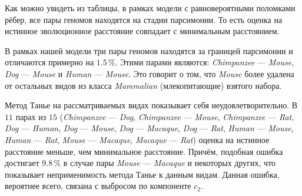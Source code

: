 Как можно увидеть из таблицы, в рамках модели с равновероятными поломками рёбер, все пары геномов находятся на стадии парсимонии. 
То есть оценка на истинное эволюционное расстояние совпадает с минимальным расстоянием.

В рамках нашей модели три пары геномов находятся за границей парсимонии и отличаются примерно на $1.5 \, \%$. 
Этими парами являются: \emph{Chimpanzee} --- \emph{Mouse}, \emph{Dog} --- \emph{Mouse} и \emph{Human} --- \emph{Mouse}.
Это говорит о том, что \emph{Mouse} более удалена от остальных видов из класса \emph{Mammalian} (млекопитающие) взятого набора.

Метод Танье на рассматриваемых видах показывает себя неудовлетворительно.
В $11$ парах из $15$ (\emph{Chimpanzee} --- \emph{Dog}, \emph{Chimpanzee} --- \emph{Mouse}, \emph{Chimpanzee} --- \emph{Rat}, \emph{Dog} --- \emph{Human}, \emph{Dog} --- \emph{Mouse}, \emph{Dog} --- \emph{Macaque}, \emph{Dog} --- \emph{Rat}, \emph{Human} --- \emph{Mouse}, \emph{Human} --- \emph{Rat}, \emph{Mouse} --- \emph{Macaque}, \emph{Macaque} --- \emph{Rat}) оценка на истинное расстояние меньше, чем минимальное расстояние. 
Причём, подобная ошибка достигает $9.8 \, \%$ в случае пары \emph{Mouse} --- \emph{Macaque} и некоторых других, что показывает неприменимость метода Танье к данным видам. 
Данная ошибка, вероятнее всего, связана с выбросом по компоненте $c_2$.

